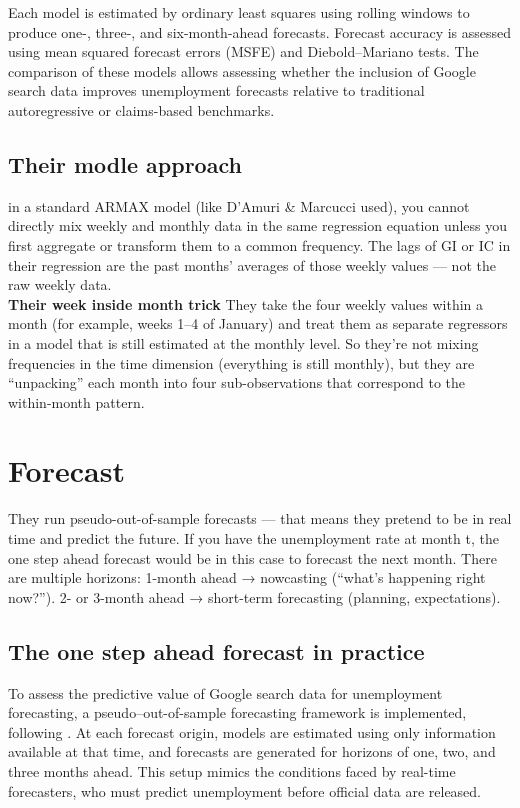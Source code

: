 \documentclass{article}
\begin{document}
Each model is estimated by ordinary least squares using rolling windows to produce one-, three-, and six-month-ahead forecasts. Forecast accuracy is assessed using mean squared forecast errors (MSFE) and Diebold–Mariano tests. The comparison of these models allows assessing whether the inclusion of Google search data improves unemployment forecasts relative to traditional autoregressive or claims-based benchmarks.


\subsection{Their modle approach}
in a standard ARMAX model (like D’Amuri \& Marcucci used), you cannot directly mix weekly and monthly data in the same regression equation unless you first aggregate or transform them to a common frequency. The lags of GI or
IC in their regression are the past months’ averages of those weekly values — not the raw weekly data.
\\
\textbf{Their week inside month trick}
They take the four weekly values within a month (for example, weeks 1–4 of January)
and treat them as separate regressors in a model that is still estimated at the monthly level.
So they’re not mixing frequencies in the time dimension (everything is still monthly),
but they are “unpacking” each month into four sub-observations that correspond to the within-month pattern.

\section{Forecast}
They run pseudo-out-of-sample forecasts — that means they pretend to be in real time and predict the future.
If you have the unemployment rate at month t, the one step ahead forecast would be in this case to forecast the next month.
There are multiple horizons: 1-month ahead → nowcasting (“what’s happening right now?”).
2- or 3-month ahead → short-term forecasting (planning, expectations).
\subsection{The one step ahead forecast in practice}
To assess the predictive value of Google search data for unemployment forecasting, a pseudo--out-of-sample forecasting framework is implemented, following \citet{DamuriMarcucci2009}. 
At each forecast origin, models are estimated using only information available at that time, and forecasts are generated for horizons of one, two, and three months ahead. 
This setup mimics the conditions faced by real-time forecasters, who must predict unemployment before official data are released.
\end{document}
